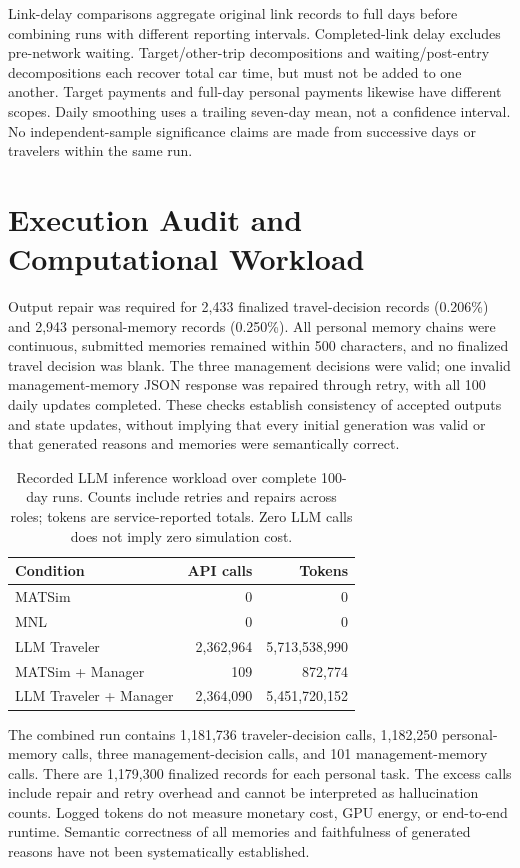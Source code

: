 Link-delay comparisons aggregate original link records to full days before combining runs with different reporting intervals. Completed-link delay excludes pre-network waiting. Target/other-trip decompositions and waiting/post-entry decompositions each recover total car time, but must not be added to one another. Target payments and full-day personal payments likewise have different scopes. Daily smoothing uses a trailing seven-day mean, not a confidence interval. No independent-sample significance claims are made from successive days or travelers within the same run.

\section{Execution Audit and Computational Workload}
\label{app:audit-cost}

Output repair was required for 2,433 finalized travel-decision records (0.206\%) and 2,943 personal-memory records (0.250\%). All personal memory chains were continuous, submitted memories remained within 500 characters, and no finalized travel decision was blank. The three management decisions were valid; one invalid management-memory JSON response was repaired through retry, with all 100 daily updates completed. These checks establish consistency of accepted outputs and state updates, without implying that every initial generation was valid or that generated reasons and memories were semantically correct.

\begin{table}[htbp]
\centering
\small
\caption{Recorded LLM inference workload over complete 100-day runs. Counts include retries and repairs across roles; tokens are service-reported totals. Zero LLM calls does not imply zero simulation cost.}
\label{tab:cost}
\begin{tabularx}{\linewidth}{@{}Xrr@{}}
\toprule
Condition & API calls & Tokens \\
\midrule
MATSim & 0 & 0 \\
MNL & 0 & 0 \\
LLM Traveler & 2,362,964 & 5,713,538,990 \\
MATSim + Manager & 109 & 872,774 \\
LLM Traveler + Manager & 2,364,090 & 5,451,720,152 \\
\bottomrule
\end{tabularx}
\end{table}

The combined run contains 1,181,736 traveler-decision calls, 1,182,250 personal-memory calls, three management-decision calls, and 101 management-memory calls. There are 1,179,300 finalized records for each personal task. The excess calls include repair and retry overhead and cannot be interpreted as hallucination counts. Logged tokens do not measure monetary cost, GPU energy, or end-to-end runtime. Semantic correctness of all memories and faithfulness of generated reasons have not been systematically established.

